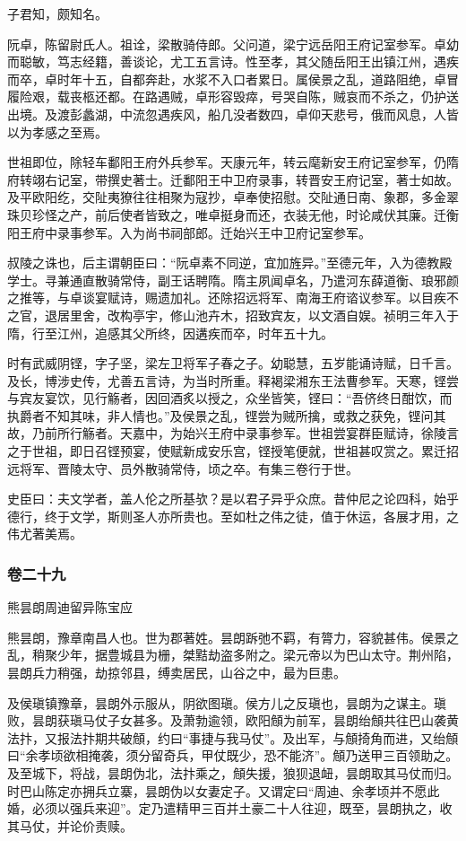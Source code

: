 \documentclass[]{article}
\begin{document}
子君知，颇知名。

阮卓，陈留尉氏人。祖诠，梁散骑侍郎。父问道，梁宁远岳阳王府记室参军。卓幼而聪敏，笃志经籍，善谈论，尤工五言诗。性至孝，其父随岳阳王出镇江州，遇疾而卒，卓时年十五，自都奔赴，水浆不入口者累日。属侯景之乱，道路阻绝，卓冒履险艰，载丧柩还都。在路遇贼，卓形容毁瘁，号哭自陈，贼哀而不杀之，仍护送出境。及渡彭蠡湖，中流忽遇疾风，船几没者数四，卓仰天悲号，俄而风息，人皆以为孝感之至焉。

世祖即位，除轻车鄱阳王府外兵参军。天康元年，转云麾新安王府记室参军，仍隋府转翊右记室，带撰史著士。迁鄱阳王中卫府录事，转晋安王府记室，著士如故。及平欧阳纥，交阯夷獠往往相聚为寇抄，卓奉使招慰。交阯通日南、象郡，多金翠珠贝珍怪之产，前后使者皆致之，唯卓挺身而还，衣装无他，时论咸伏其廉。迁衡阳王府中录事参军。入为尚书祠部郎。迁始兴王中卫府记室参军。

叔陵之诛也，后主谓朝臣曰：``阮卓素不同逆，宜加旌异。''至德元年，入为德教殿学士。寻兼通直散骑常侍，副王话聘隋。隋主夙闻卓名，乃遣河东薛道衡、琅邪颜之推等，与卓谈宴赋诗，赐遗加礼。还除招远将军、南海王府谘议参军。以目疾不之官，退居里舍，改构亭宇，修山池卉木，招致宾友，以文酒自娱。祯明三年入于隋，行至江州，追感其父所终，因遘疾而卒，时年五十九。

时有武威阴铿，字子坚，梁左卫将军子春之子。幼聪慧，五岁能诵诗赋，日千言。及长，博涉史传，尤善五言诗，为当时所重。释褐梁湘东王法曹参军。天寒，铿尝与宾友宴饮，见行觞者，因回酒炙以授之，众坐皆笑，铿曰：``吾侪终日酣饮，而执爵者不知其味，非人情也。''及侯景之乱，铿尝为贼所擒，或救之获免，铿问其故，乃前所行觞者。天嘉中，为始兴王府中录事参军。世祖尝宴群臣赋诗，徐陵言之于世祖，即日召铿预宴，使赋新成安乐宫，铿授笔便就，世祖甚叹赏之。累迁招远将军、晋陵太守、员外散骑常侍，顷之卒。有集三卷行于世。

史臣曰：夫文学者，盖人伦之所基欤？是以君子异乎众庶。昔仲尼之论四科，始乎德行，终于文学，斯则圣人亦所贵也。至如杜之伟之徒，值于休运，各展才用，之伟尤著美焉。

\hypertarget{header-n5155}{%
\subsubsection{卷二十九}\label{header-n5155}}

熊昙朗周迪留异陈宝应

熊昙朗，豫章南昌人也。世为郡著姓。昙朗跅弛不羁，有膂力，容貌甚伟。侯景之乱，稍聚少年，据豊城县为栅，桀黠劫盗多附之。梁元帝以为巴山太守。荆州陷，昙朗兵力稍强，劫掠邻县，缚卖居民，山谷之中，最为巨患。

及侯瑱镇豫章，昙朗外示服从，阴欲图瑱。侯方儿之反瑱也，昙朗为之谋主。瑱败，昙朗获瑱马仗子女甚多。及萧勃逾领，欧阳頠为前军，昙朗绐頠共往巴山袭黄法抃，又报法抃期共破頠，约曰``事捷与我马仗''。及出军，与頠掎角而进，又绐頠曰``余孝顷欲相掩袭，须分留奇兵，甲仗既少，恐不能济''。頠乃送甲三百领助之。及至城下，将战，昙朗伪北，法抃乘之，頠失援，狼狈退衄，昙朗取其马仗而归。时巴山陈定亦拥兵立寨，昙朗伪以女妻定子。又谓定曰``周迪、余孝顷并不愿此婚，必须以强兵来迎''。定乃遣精甲三百并土豪二十人往迎，既至，昙朗执之，收其马仗，并论价责赎。
\end{document}
